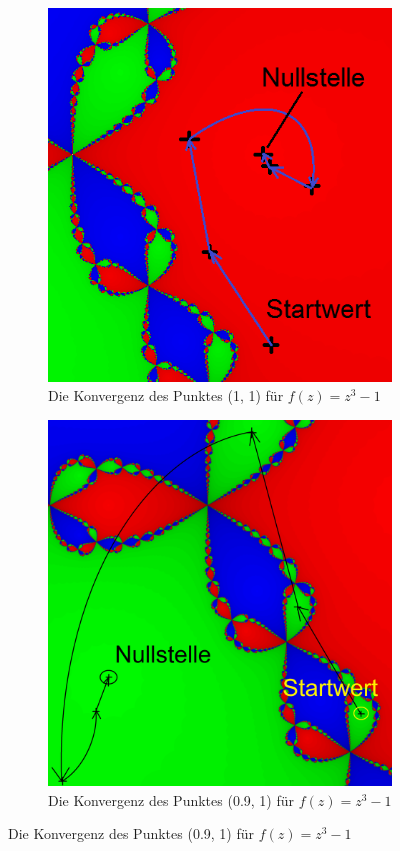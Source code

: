 \documentclass[a4paper,12pt]{llncs}
\makeatletter
\newcommand\nocaption{%
	\renewcommand\p@subfigure{}
	\renewcommand\thesubfigure{\thefigure\alph{subfigure}}
}
\numberwithin{equation}{section}
\makeatother
\begin{document}
\begin{figure}[ht]   
	\nocaption
	\begin{subfigure}{.5\textwidth}
		\centering
		\includegraphics[width=.8\linewidth]{figures/output_points3}
		\captionsetup{width=0.8\textwidth}
		\caption{Die Konvergenz des Punktes (1, 1) für $f(z)=z^3-1$ }
		\label{fig:output_points3}
	\end{subfigure}%
	\begin{subfigure}{.5\textwidth}
		\centering
		\includegraphics[width=.8\linewidth]{figures/output_points_g3}
		\captionsetup{width=0.8\textwidth}
		\caption{Die Konvergenz des Punktes (0.9, 1) für $f(z)=z^3-1$ }
		\label{fig:output_points_g3}
	\end{subfigure}%
\end{figure}
\end{document}
